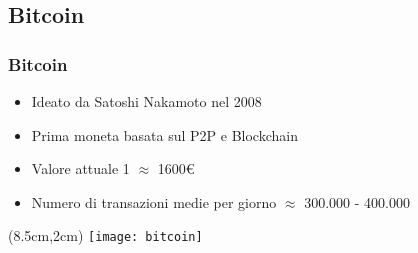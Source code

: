 \subsection{Bitcoin}
\begin{frame}
 \frametitle{Bitcoin}

 \begin{itemize}
  \item<1-> Ideato da Satoshi Nakamoto nel 2008
  \item<2-> Prima moneta basata sul P2P e Blockchain%
  \item<3-> Valore attuale 1\bitcoin{} $ \approx $  1600\euro{}
  \item<4-> Numero di transazioni medie per giorno $ \approx $ 300.000 - 400.000
 \end{itemize}



 \begin{textblock*}{5cm}(8.5cm,2cm)
  \texttt{[image: bitcoin]}
 \end{textblock*}

\end{frame}
